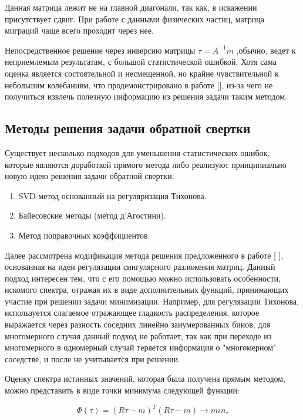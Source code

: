 \documentclass[a4paper,12pt]{diplom}
\begin{document}
Данная матрица лежит не на главной диагонали, так как, в искажении присутствует сдвиг. При работе с данными физических частиц, 
матрица миграций чаще всего проходит через нее.

Непосредственное решение через инверсию матрицы $\tau = A^{-1} m$ ,обычно, ведет к неприемлемым результатам, с большой статистической
ошибкой. Хотя сама оценка является состоятельной и несмещенной, но крайне чувствительной к небольшим колебаниям, что продемонстрировано 
в работе [], из-за чего не получиться извлечь полезную информацию из решения задачи таким методом.


\subsection*{Методы решения задачи обратной свертки}

Существует несколько подходов для уменьшения статистических ошибок, которые являются доработкой прямого метода либо реализуют принципиально
новую идею решения задачи обратной свертки:
\begin{enumerate}
\item SVD-метод основанный на регуляризация Тихонова.
\item Байесовские методы (метод д’Агостини).
\item Метод поправочных коэффициентов.
\end{enumerate}

Далее рассмотрена модификация метода решения предложенного в работе [ ], основанная на идеи регулязации сингулярного разложения матриц. 
Данный подход интересен тем, что с его помощью можно использовать особенности, искомого спектра, отражая их в виде дополнительных функций, 
принимающих участие при решении задачи минимизации. Например, для регулязации Тихонова, используется слагаемое отражающее гладкость 
распределения, которое выражается через разность соседних линейно занумерованных бинов, для многомерного случая данный подход не работает, 
так как при переходе из многомерного в одномерный случай теряется информация о "многомерном" соседстве, и после не учитывается при решении.

Оценку спектра истинных значений, которая была получена прямым методом, можно представить в виде точки минимума следующей функции: 

\begin{equation}
   \Phi(\tau)=(R\tau-m)^T (R\tau-m) \to min_{\tau}
   \label{min_base}
\end{equation}
\end{document}
